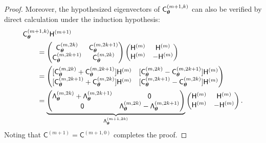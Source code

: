 \documentclass[graybox,footinfo]{svmult}
\begin{document}
\begin{proof}
    Moreover, the hypothesized eigenvectors of $\mathsf{C}_{{\boldsymbol{\theta}}}^{(m+1,k)}$ can also be verified by direct calculation under the induction hypothesis:
     \begin{align*}
        \MoveEqLeft{\mathsf{C}_{\bstheta}^{(m+1,k)} \mathsf{H}^{(m+1)}} \\
        & =  
        \begin{pmatrix} \mathsf{C}_{\bstheta}^{(m,2k)} & \mathsf{C}_{\bstheta}^{(m,2k+1)} \\
        \mathsf{C}_{\bstheta}^{(m,2k+1)} & \mathsf{C}_{\bstheta}^{(m,2k)}
        \end{pmatrix} 
        \begin{pmatrix}
        \mathsf{H}^{(m)} &   \mathsf{H}^{(m)} \\
         \mathsf{H}^{(m)} & - \mathsf{H}^{(m)}
        \end{pmatrix}\\
        & = 
    \begin{pmatrix}
        [\mathsf{C}_{\bstheta}^{(m,2k)} + \mathsf{C}_{\bstheta}^{(m,2k+1)}] \mathsf{H}^{(m)} & [\mathsf{C}_{\bstheta}^{(m,2k)} - \mathsf{C}_{\bstheta}^{(m,2k+1)}] \mathsf{H}^{(m)}\\
        [\mathsf{C}_{\bstheta}^{(m,2k+1)} + \mathsf{C}_{\bstheta}^{(m,2k)}] \mathsf{H}^{(m)} &   [\mathsf{C}_{\bstheta}^{(m,2k+1)} - \mathsf{C}_{\bstheta}^{(m,2k)}] \mathsf{H}^{(m)}
        \end{pmatrix} \\
        & = \underbrace{\begin{pmatrix}
        \mathsf{\Lambda}_\bstheta^{(m,2k)} + \mathsf{\Lambda}_\bstheta^{(m,2k+1)}  & \mathsf{0}\\
        \mathsf{0} &   \mathsf{\Lambda}_\bstheta^{(m,2k)} - \mathsf{\Lambda}_\bstheta^{(m,2k+1)}
        \end{pmatrix}}_{\mathsf{\Lambda}_\bstheta^{(m+1,2k)}} 
        \begin{pmatrix}
        \mathsf{H}^{(m)} & \mathsf{H}^{(m)} \\ \mathsf{H}^{(m)} & -\mathsf{H}^{(m)}
        \end{pmatrix}.
    \end{align*}
Noting that $\mathsf{C}^{(m+1)} = \mathsf{C}^{(m+1,0)} $ completes the proof.
\end{proof}
\end{document}
